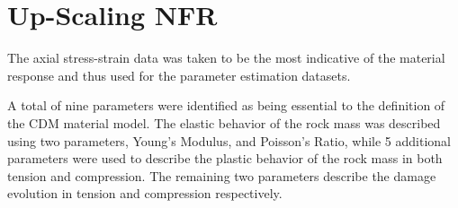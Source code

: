 \section{Up-Scaling NFR}

The axial stress-strain data was taken to be the most indicative of the material response and thus used for the parameter estimation datasets.


A total of nine parameters were identified as being essential to the definition of the CDM material model. The elastic behavior of the rock mass was described using two parameters, Young’s Modulus, and Poisson’s Ratio, while 5 additional parameters were used to describe the plastic behavior of the rock mass in both tension and compression. The remaining two parameters describe the damage evolution in tension and compression respectively.
